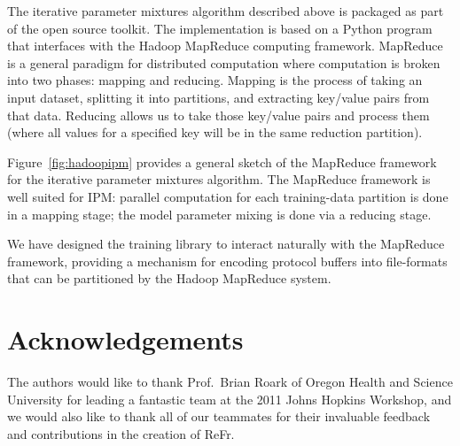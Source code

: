 \documentclass[a4paper]{article}
\begin{document}
The iterative parameter mixtures algorithm described above is packaged as part
of the open source toolkit.  The implementation is based on a Python program
that interfaces with the Hadoop MapReduce computing framework.
MapReduce is a general paradigm for distributed computation
\cite{dean08mapreduce} where computation is broken into two phases:
mapping and reducing.  Mapping is the process of taking an input dataset,
splitting it into partitions, and extracting key/value pairs from that data.
Reducing allows us to take those key/value pairs and process them (where all
values for a specified key will be in the same reduction partition).

Figure~\ref{fig:hadoopipm} provides a general sketch of the MapReduce framework
for the iterative parameter mixtures algorithm.
The MapReduce framework is well suited for IPM: parallel computation for each
training-data partition is done in a mapping stage; the model parameter mixing
is done via a reducing stage.

We have designed the training library to interact naturally with the
MapReduce framework, providing a mechanism for encoding protocol buffers
into file-formats that can be partitioned by the Hadoop MapReduce
system.

\section{Acknowledgements}
The authors would like to thank Prof.\ Brian Roark of Oregon Health and
Science University for leading a fantastic team at the 2011 Johns
Hopkins Workshop, and we would also like to thank all of our teammates
for their invaluable feedback and contributions in the creation of
ReFr.

\newpage
%
\eightpt


\end{document}
